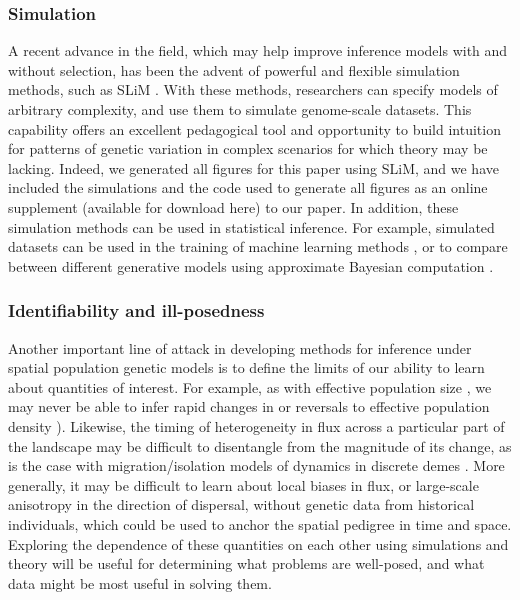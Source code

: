 \documentclass{ar-1col}
\begin{document}
\subsubsection{Simulation} 
A recent advance in the field, 
which may help improve inference models with and without selection, 
has been the advent of powerful and flexible simulation methods, 
such as SLiM \citep{haller2018forward,haller2018treesequence,kelleher2018efficient}.
With these methods, 
researchers can specify models of arbitrary complexity, 
and use them to simulate genome-scale datasets.
This capability offers an excellent pedagogical tool 
and opportunity to build intuition for patterns of genetic variation 
in complex scenarios for which theory may be lacking.
Indeed, we generated all figures for this paper using SLiM, 
and we have included the simulations 
and the code used to generate all figures 
as an online supplement (available for download here) 
to our paper.
In addition, these simulation methods can be used in statistical inference.
For example, simulated datasets can be used in the training 
of machine learning methods \citep[e.g.,][]{flagel2018unreasonable}, 
or to compare between different generative models using 
approximate Bayesian computation \citep{MarjoramTavare2006modern}.

\subsubsection{Identifiability and ill-posedness}

Another important line of attack in developing methods for inference 
under spatial population genetic models 
is to define the limits of our ability to learn about 
quantities of interest.
For example, 
as with effective population size \citep{Myers2008},
we may never be able to infer rapid changes in 
or reversals to effective population density
\citep[although see also][]{BhaskarSong2014descartes}).
Likewise, 
the timing of heterogeneity in flux across a particular part of the landscape 
may be difficult to disentangle from the magnitude of its change, 
as is the case with migration/isolation models 
of dynamics in discrete demes \citep{sousa2011nonidentifiability}.
More generally,
it may be difficult to learn about local biases in flux, 
or large-scale anisotropy in the direction of dispersal,
without genetic data from historical individuals, 
which could be used to anchor the spatial pedigree 
in time and space.
Exploring the dependence of these quantities on each other 
using simulations and theory 
will be useful for determining what problems are well-posed, 
and what data might be most useful in solving them.
\end{document}
